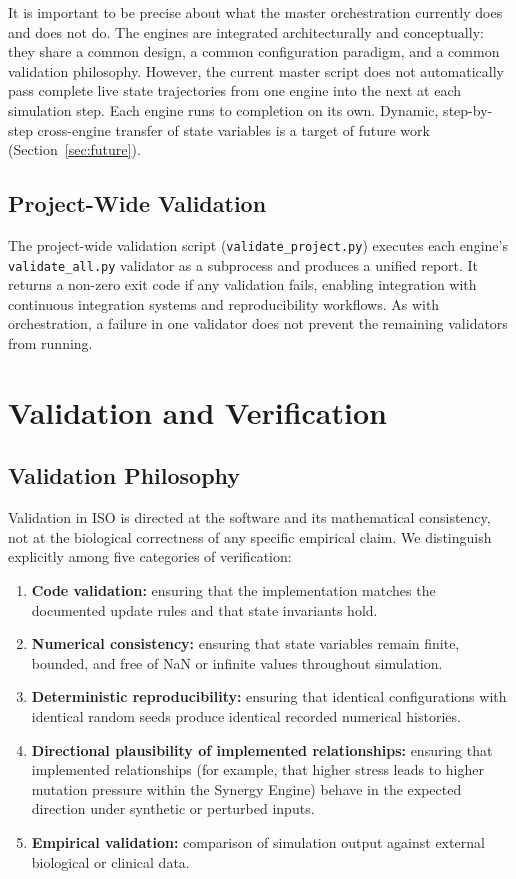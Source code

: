 \documentclass[12pt,a4paper]{article}
\begin{document}
It is important to be precise about what the master orchestration currently does and does not do. The engines are integrated architecturally and conceptually: they share a common design, a common configuration paradigm, and a common validation philosophy. However, the current master script does not automatically pass complete live state trajectories from one engine into the next at each simulation step. Each engine runs to completion on its own. Dynamic, step-by-step cross-engine transfer of state variables is a target of future work (Section~\ref{sec:future}).

\subsection{Project-Wide Validation}

The project-wide validation script (\texttt{validate\_project.py}) executes each engine's \texttt{validate\_all.py} validator as a subprocess and produces a unified report. It returns a non-zero exit code if any validation fails, enabling integration with continuous integration systems and reproducibility workflows. As with orchestration, a failure in one validator does not prevent the remaining validators from running.

\section{Validation and Verification}
\label{sec:validation}

\subsection{Validation Philosophy}

Validation in ISO is directed at the software and its mathematical consistency, not at the biological correctness of any specific empirical claim. We distinguish explicitly among five categories of verification:

\begin{enumerate}[leftmargin=*]
    \item \textbf{Code validation:} ensuring that the implementation matches the documented update rules and that state invariants hold.
    \item \textbf{Numerical consistency:} ensuring that state variables remain finite, bounded, and free of NaN or infinite values throughout simulation.
    \item \textbf{Deterministic reproducibility:} ensuring that identical configurations with identical random seeds produce identical recorded numerical histories.
    \item \textbf{Directional plausibility of implemented relationships:} ensuring that implemented relationships (for example, that higher stress leads to higher mutation pressure within the Synergy Engine) behave in the expected direction under synthetic or perturbed inputs.
    \item \textbf{Empirical validation:} comparison of simulation output against external biological or clinical data.
\end{enumerate}
\end{document}
